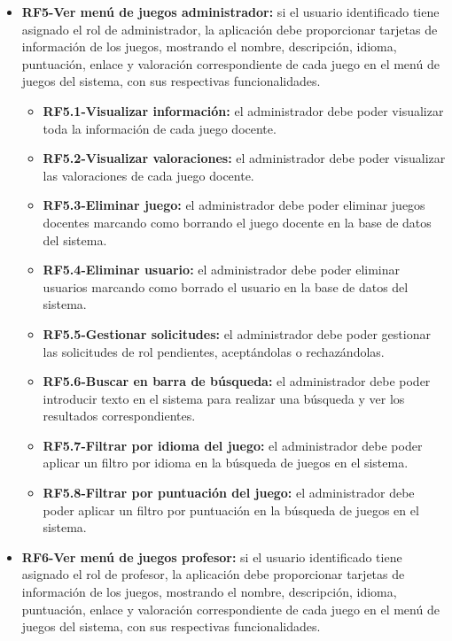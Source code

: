 \begin{itemize}
\begin{itemize}
        \end{itemize}
    \item \textbf{RF5-Ver menú de juegos administrador:} si el usuario identificado tiene asignado el rol de administrador, la aplicación debe proporcionar tarjetas de información de los juegos, mostrando el nombre, descripción, idioma, puntuación, enlace y valoración correspondiente de cada juego en el menú de juegos del sistema, con sus respectivas funcionalidades.
        \begin{itemize}
        \tightlist
            \item \textbf{RF5.1-Visualizar información:} el administrador debe poder visualizar toda la información de cada juego docente.
            \item \textbf{RF5.2-Visualizar valoraciones:} el administrador debe poder visualizar las valoraciones de cada juego docente.
            \item \textbf{RF5.3-Eliminar juego:} el administrador debe poder eliminar juegos docentes marcando como borrando el juego docente en la base de datos del sistema.
            \item \textbf{RF5.4-Eliminar usuario:} el administrador debe poder eliminar usuarios marcando como borrado el usuario en la base de datos del sistema.
            \item \textbf{RF5.5-Gestionar solicitudes:} el administrador debe poder gestionar las solicitudes de rol pendientes, aceptándolas o rechazándolas.
            \item \textbf{RF5.6-Buscar en barra de búsqueda:} el administrador debe poder introducir texto en el sistema para realizar una búsqueda y ver los resultados correspondientes.
            \item \textbf{RF5.7-Filtrar por idioma del juego:} el administrador debe poder aplicar un filtro por idioma en la búsqueda de juegos en el sistema.
            \item\textbf{RF5.8-Filtrar por puntuación del juego:} el administrador debe poder aplicar un filtro por puntuación en la búsqueda de juegos en el sistema.
        \end{itemize}
    \item \textbf{RF6-Ver menú de juegos profesor:} si el usuario identificado tiene asignado el rol de profesor, la aplicación debe proporcionar tarjetas de información de los juegos, mostrando el nombre, descripción, idioma, puntuación, enlace y valoración correspondiente de cada juego en el menú de juegos del sistema, con sus respectivas funcionalidades.

\end{itemize}
